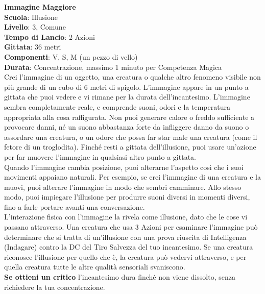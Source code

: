 \begin{multicols}{2}
\medskip\textbf{Immagine Maggiore}\\
\textbf{Scuola}: Illusione\\
\textbf{Livello}: 3, Comune\\
\textbf{Tempo di Lancio}: 2 Azioni\\
\textbf{Gittata}: 36 metri\\
\textbf{Componenti}: V, S, M (un pezzo di vello)\\
\textbf{Durata}: Concentrazione, massimo 1 minuto per Competenza Magica\\
Crei l'immagine di un oggetto, una creatura o qualche altro fenomeno visibile non più grande di un cubo di 6 metri di spigolo. L'immagine appare in un punto a gittata che puoi vedere e vi rimane per la durata dell'incantesimo. L'immagine sembra completamente reale, e comprende suoni, odori e la temperatura appropriata alla cosa raffigurata. Non puoi generare calore o freddo sufficiente a provocare danni, né un suono abbastanza forte da infliggere danno da suono o assordare una creatura, o un odore che possa far star male una creatura (come il fetore di un troglodita). Finché resti a gittata dell'illusione, puoi usare un'azione per far muovere l'immagine in qualsiasi altro punto a gittata.\\
Quando l'immagine cambia posizione, puoi alterarne l'aspetto così che i suoi movimenti appaiano naturali. Per esempio, se crei l'immagine di una creatura e la muovi, puoi alterare l'immagine in modo che sembri camminare. Allo stesso modo, puoi impiegare l'illusione per produrre suoni diversi in momenti diversi, fino a farle portare avanti una conversazione.\\
L'interazione fisica con l'immagine la rivela come illusione, dato che le cose vi passano attraverso. Una creatura che usa 3 Azioni per esaminare l'immagine può determinare che si tratta di un'illusione con una prova riuscita di Intelligenza (Indagare) contro la DC del Tiro Salvezza del tuo incantesimo. Se una creatura riconosce l'illusione per quello che è, la creatura può vedervi attraverso, e per quella creatura tutte le altre qualità sensoriali svaniscono.\\
\textbf{Se ottieni un critico} l'incantesimo dura finché non viene dissolto, senza richiedere la tua concentrazione.


\end{multicols}
